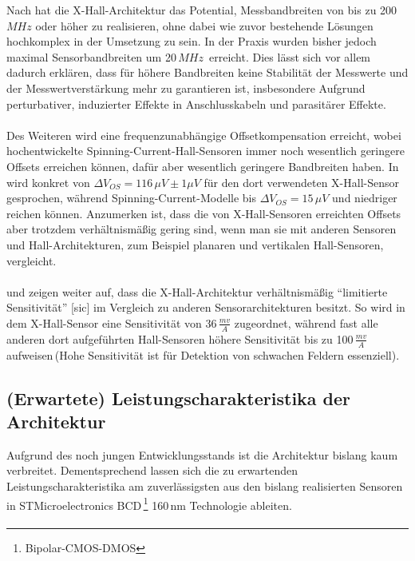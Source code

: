 \documentclass[12pt, a4paper]{article}
\begin{document}
Nach \cite{cres21} hat die X-Hall-Architektur das Potential, Messbandbreiten von bis zu 200\,$MHz$ oder höher zu realisieren, ohne dabei wie zuvor bestehende Lösungen hochkomplex in der Umsetzung zu sein. In der Praxis wurden bisher jedoch maximal Sensorbandbreiten um  20\,$MHz$\,\cite{cres19} erreicht.\newline
Dies lässt sich vor allem dadurch erklären, dass für höhere Bandbreiten keine Stabilität der Messwerte und der Messwertverstärkung mehr zu garantieren ist, insbesondere Aufgrund perturbativer, induzierter Effekte in Anschlusskabeln und parasitärer Effekte.\paragraph{}
Des Weiteren wird eine frequenzunabhängige Offsetkompensation erreicht, wobei hochentwickelte Spinning-Current-Hall-Sensoren immer noch wesentlich geringere Offsets erreichen können, dafür aber wesentlich geringere Bandbreiten haben. In \cite{cres22} wird konkret von $\Delta{V_{OS}}=116\,\mu{V}\pm1\mu{V}$ für den dort verwendeten X-Hall-Sensor gesprochen, während Spinning-Current-Modelle bis $\Delta{V_{OS}}=15\,\mu{V}$ und niedriger reichen können. Anzumerken ist, dass die von X-Hall-Sensoren erreichten Offsets aber trotzdem verhältnismäßig gering sind, wenn man sie mit anderen Sensoren und Hall-Architekturen, zum Beispiel planaren und vertikalen Hall-Sensoren, vergleicht.\paragraph{}
\cite{cres22} und \cite{cres23} zeigen weiter auf, dass die X-Hall-Architektur verhältnismäßig ``limitierte Sensitivität'' [sic] im Vergleich zu anderen Sensorarchitekturen besitzt. So wird in \cite{cres21Hall} dem X-Hall-Sensor eine Sensitivität von 36\,$\frac{mv}{A}$ zugeordnet, während fast alle anderen dort aufgeführten Hall-Sensoren höhere Sensitivität bis zu 100\,$\frac{mv}{A}$ aufweisen\,(Hohe Sensitivität ist für Detektion von schwachen Feldern essenziell). 


\subsection{(Erwartete) Leistungscharakteristika der Architektur}
Aufgrund des noch jungen Entwicklungsstands ist die Architektur bislang kaum verbreitet. Dementsprechend lassen sich die zu erwartenden Leistungscharakteristika am zuverlässigsten aus den bislang realisierten Sensoren in STMicroelectronics BCD\,\footnote{Bipolar-CMOS-DMOS} 160\,nm Technologie ableiten.\paragraph{}
\end{document}
